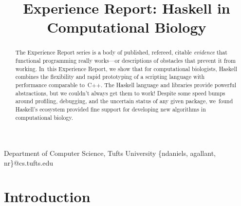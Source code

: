 \documentclass[preprint,nonatbib,blockstyle,nocopyrightspace,times]{sigplanconf}
\begin{document}
\copyrightdata{[to be supplied]} 


\title{Experience Report: Haskell in Computational Biology}


           {Department of Computer Science, Tufts University}
           {{\rmfamily\{}ndaniels, agallant, nr{\rmfamily\}}@cs.tufts.edu}


\maketitle

%
%
%
\begin{abstract}
The Experience Report series is
a body of published, refereed, citable \emph{evidence} that functional
programming really works---or descriptions of obstacles that prevent
it from working.   
In~this Experience Report, we show that for computational biologists,
Haskell combines the flexibility and rapid prototyping of a scripting
language with performance comparable to~C++.
The Haskell language and libraries provide powerful abstractions, 
but we couldn't always get them to work!
Despite some speed bumps around profiling, debugging, and the
uncertain status of any given package, we~found Haskell's ecosystem
provided fine support for developing new algorithms in computational
biology.
\end{abstract}

% 
% 

\section{Introduction}
\end{document}
